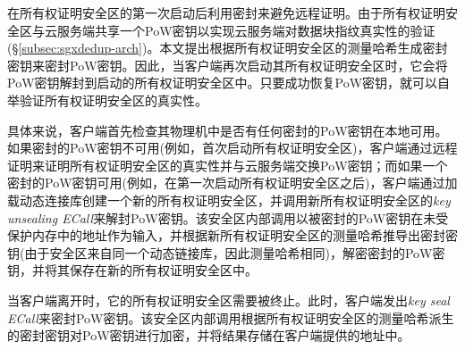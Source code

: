 \sysnameS 在所有权证明安全区的第一次启动后利用密封来避免远程证明。由于所有权证明安全区与云服务端共享一个PoW密钥以实现云服务端对数据块指纹真实性的验证(\S\ref{subsec:sgxdedup-arch})。本文提出根据所有权证明安全区的测量哈希生成密封密钥来密封PoW密钥。因此，当客户端再次启动其所有权证明安全区时，它会将PoW密钥解封到启动的所有权证明安全区中。只要成功恢复PoW密钥，就可以自举验证所有权证明安全区的真实性。

具体来说，客户端首先检查其物理机中是否有任何密封的PoW密钥在本地可用。如果密封的PoW密钥不可用(例如，首次启动所有权证明安全区)，客户端通过远程证明来证明所有权证明安全区的真实性并与云服务端交换PoW密钥；而如果一个密封的PoW密钥可用(例如，在第一次启动所有权证明安全区之后)，客户端通过加载动态连接库创建一个新的所有权证明安全区，并调用新所有权证明安全区的\textit{key unsealing ECall}来解封PoW密钥。该安全区内部调用以被密封的PoW密钥在未受保护内存中的地址作为输入，并根据新所有权证明安全区的测量哈希推导出密封密钥(由于安全区来自同一个动态链接库，因此测量哈希相同)，解密密封的PoW密钥，并将其保存在新的所有权证明安全区中。

当客户端离开\sysnameS 时，它​​的所有权证明安全区需要被终止。此时，客户端发出\textit{key seal ECall}来密封PoW密钥。该安全区内部调用根据所有权证明安全区的测量哈希派生的密封密钥对PoW密钥进行加密，并将结果存储在客户端提供的地址中。